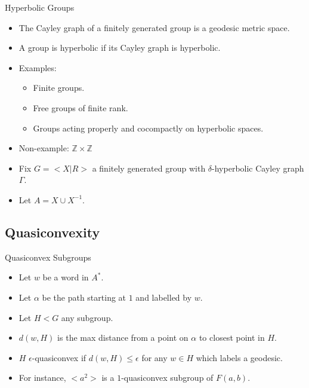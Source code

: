 \documentclass{beamer}
\begin{document}
\begin{frame}{Hyperbolic Groups}
  \begin{itemize}
  \item The Cayley graph of a finitely generated group is a geodesic metric space.
  \item A group is hyperbolic if its Cayley graph is hyperbolic.
  \item Examples:
  \begin{itemize}
    \pause
    \item Finite groups.
    \pause
    \item Free groups of finite rank.
    \pause
    \item Groups acting properly and cocompactly on hyperbolic spaces.
  \end{itemize}
  \pause
  \item Non-example: $\mathbb{Z}\times\mathbb{Z}$
  \pause
  \item Fix $G = <\!\!X | R\!\!>$ a finitely generated group with $\delta$-hyperbolic Cayley graph $\Gamma$.
  \item Let $A = X \cup X^{-1}$.
  \end{itemize}

\end{frame}

\subsection{Quasiconvexity}

\begin{frame}{Quasiconvex Subgroups}
  \begin{itemize}
    \item Let $w$ be a word in $A^*$.
	\item Let $\alpha$ be the path starting at $1$ and labelled by $w$.
	\item Let $H < G$ any subgroup.
	\item $d(w, H)$ is the max distance from a point on $\alpha$ to closest point in $H$.
  	\begin{figure}
	
	\end{figure}
	\pause
	\item $H$ $\epsilon$-quasiconvex if $d(w, H) \le \epsilon$ for any $w \in H$ which labels a geodesic.
	\pause
	\item For instance, $<\!\!a^2\!\!>$ is a $1$-quasiconvex subgroup of $F(a, b)$.
  \end{itemize}
\end{frame}
\end{document}
